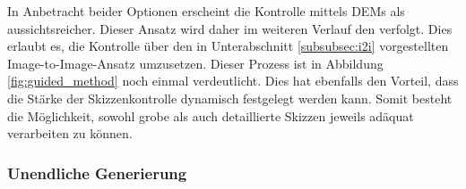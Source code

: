 In Anbetracht beider Optionen erscheint die Kontrolle mittels \ac{DEM}s als aussichtsreicher. Dieser Ansatz wird daher im weiteren Verlauf den verfolgt. Dies erlaubt es, die Kontrolle über den in Unterabschnitt \ref{subsubsec:i2i} vorgestellten Image-to-Image-Ansatz umzusetzen. Dieser Prozess ist in Abbildung \ref{fig:guided_method} noch einmal verdeutlicht. Dies hat ebenfalls den Vorteil, dass die Stärke der Skizzenkontrolle dynamisch festgelegt werden kann. Somit besteht die Möglichkeit, sowohl grobe als auch detaillierte Skizzen jeweils adäquat verarbeiten zu können. 

\subsubsection {Unendliche Generierung}

